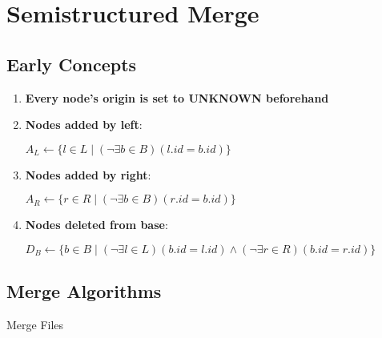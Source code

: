 \documentclass[../Algorithms.tex]{subfiles}
\begin{document}
    \section{Semistructured Merge}

    \subsection{Early Concepts}

    \begin{enumerate}
        \item \textbf{Every node's origin is set to UNKNOWN beforehand}
        
        \item \textbf{Nodes added by left}:
        
        $A_L \leftarrow \{l \in L \mid (\lnot \exists b \in B)(l.id = b.id)\}$\;

        \item \textbf{Nodes added by right}:
        
        $A_R \leftarrow \{r \in R \mid (\lnot \exists b \in B)(r.id = b.id)\}$\;

        \item \textbf{Nodes deleted from base}:
        
        $D_B \leftarrow \{b \in B \mid (\lnot \exists l \in L)(b.id = l.id) \land (\lnot \exists r \in R)(b.id = r.id)\}$\;
    \end{enumerate}

    \subsection{Merge Algorithms}

    \begin{algorithm}[H]
        \caption{Merge Files}


        \BlankLine

    \end{algorithm}
\end{document}
